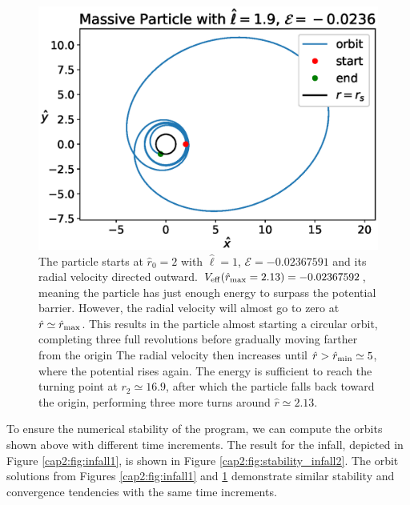 \begin{figure}[h!]
    \centering
    \includegraphics[width= 0.5 \textwidth]{Figures/chapter2/volevi.eps}
    \caption{The particle starts at $\hat r_0 = 2$ with $\hat \ell = 1$,
    $\mathcal E = -0.02367591$ and its radial velocity directed outward.
    $V_{\rm eff} (\hat r_{\rm max} = 2.13) = -0.02367592$, meaning the particle
    has just enough energy to surpass the potential barrier.
    However, the radial velocity will almost go to zero at
    $\hat r \simeq \hat r_{\rm max}$.
    This results in the particle almost starting a circular orbit, completing
    three full revolutions before gradually moving farther from the origin
    The radial velocity then increases until
    $\hat r > \hat r_{\rm min} \simeq 5$, where the potential rises again.
    The energy is sufficient to reach the turning point at $r_2 \simeq 16.9$,
    after which the particle falls back toward the origin, performing three more
    turns around $\hat r \simeq 2.13$.}
    \label{cap2:fig:volevi}
\end{figure}

To ensure the numerical stability of the program, we can compute the orbits
shown above with different time increments.
The result for the infall, depicted in Figure \ref{cap2:fig:infall1}, is shown
in Figure \ref{cap2:fig:stability_infall2}.
The orbit solutions from Figures \ref{cap2:fig:infall1} and
\ref{cap2:fig:volevi} demonstrate similar stability and convergence tendencies
with the same time increments.

